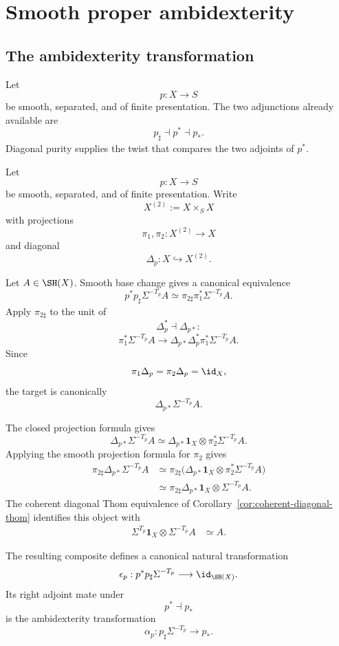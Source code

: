 \section{Smooth proper ambidexterity}
\label{sec:smooth-proper-ambidexterity}

\subsection{The ambidexterity transformation}

Let
\[
    p:X\longrightarrow S
\]
be smooth, separated, and of finite presentation.  The two adjunctions already
available are
\[
    p_\sharp\dashv p^*\dashv p_*.
\]
Diagonal purity supplies the twist that compares the two adjoints of
\(p^*\).

\begin{construction}
\label{constr:ambidexterity-transformation}
Let
\[
    p:X\longrightarrow S
\]
be smooth, separated, and of finite presentation.  Write
\[
    X^{(2)}:=X\times_SX
\]
with projections
\[
    \pi_1,\pi_2:X^{(2)}\longrightarrow X
\]
and diagonal
\[
    \Delta_p:X\hookrightarrow X^{(2)}.
\]

Let \(A\in\SH(X)\).  Smooth base change gives a canonical equivalence
\[
    p^*p_\sharp\Sigma^{-T_p}A
    \simeq
    \pi_{2\sharp}\pi_1^*\Sigma^{-T_p}A.
\]
Apply \(\pi_{2\sharp}\) to the unit of
\[
    \Delta_p^*\dashv\Delta_{p*}:
\]
\[
    \pi_1^*\Sigma^{-T_p}A
    \longrightarrow
    \Delta_{p*}\Delta_p^*
    \pi_1^*\Sigma^{-T_p}A.
\]
Since
\[
    \pi_1\Delta_p
    =
    \pi_2\Delta_p
    =
    \id_X,
\]
the target is canonically
\[
    \Delta_{p*}\Sigma^{-T_p}A.
\]

The closed projection formula gives
\[
    \Delta_{p*}\Sigma^{-T_p}A
    \simeq
    \Delta_{p*}\mathbf1_X
    \otimes
    \pi_2^*\Sigma^{-T_p}A.
\]
Applying the smooth projection formula for \(\pi_2\) gives
\[
\begin{aligned}
    \pi_{2\sharp}
    \Delta_{p*}\Sigma^{-T_p}A
    &\simeq
    \pi_{2\sharp}
    \bigl(
      \Delta_{p*}\mathbf1_X
      \otimes
      \pi_2^*\Sigma^{-T_p}A
    \bigr) \\
    &\simeq
    \pi_{2\sharp}\Delta_{p*}\mathbf1_X
    \otimes
    \Sigma^{-T_p}A.
\end{aligned}
\]
The coherent diagonal Thom equivalence of
Corollary~\ref{cor:coherent-diagonal-thom}
identifies this object with
\[
\begin{aligned}
    \Sigma^{T_p}\mathbf1_X
    \otimes
    \Sigma^{-T_p}A
    &\simeq
    A.
\end{aligned}
\]

The resulting composite defines a canonical natural transformation
\[
    \epsilon_p:
    p^*p_\sharp\Sigma^{-T_p}
    \longrightarrow
    \id_{\SH(X)}.
\]
Its right adjoint mate under
\[
    p^*\dashv p_*
\]
is the ambidexterity transformation
\[
    \alpha_p:
    p_\sharp\Sigma^{-T_p}
    \longrightarrow
    p_*.
\]
\end{construction}

